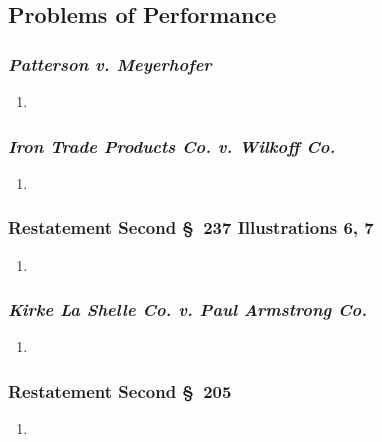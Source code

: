 \subsection{Problems of Performance}

\subsubsection{\emph{Patterson v. Meyerhofer}}

\begin{enumerate}
    \item %
\end{enumerate}

\subsubsection{\emph{Iron Trade Products Co. v. Wilkoff Co.}}

\begin{enumerate}
    \item %
\end{enumerate}

\subsubsection{Restatement Second \S\ 237 Illustrations 6, 7}

\begin{enumerate}
    \item %
\end{enumerate}

\subsubsection{\emph{Kirke La Shelle Co. v. Paul Armstrong Co.}}

\begin{enumerate}
    \item %
\end{enumerate}

\subsubsection{Restatement Second \S\ 205}

\begin{enumerate}
    \item %
\end{enumerate}

